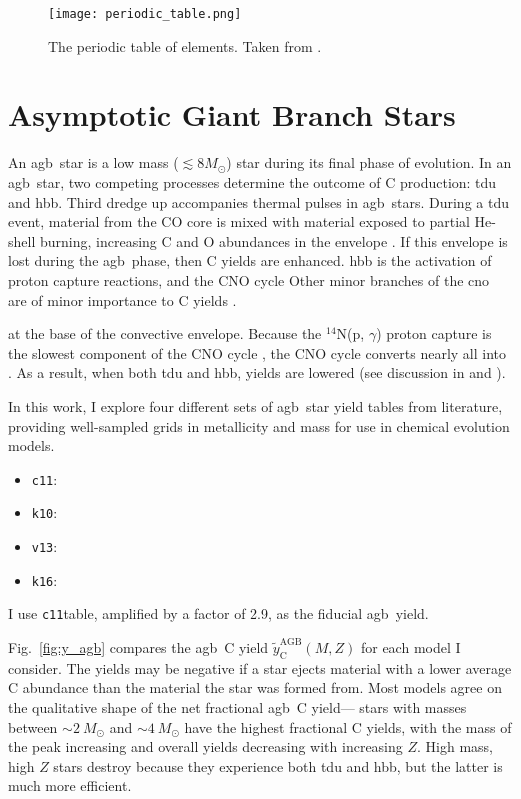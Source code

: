 \documentclass[12pt,oneside,letterpaper]{report}
\newcommand{\agb}{\gls{agb}}
\newcommand{\cxi}{\texttt{\gls{c11}}}
\newcommand{\kx}{\texttt{\gls{k10}}}
\newcommand{\kxvi}{\texttt{\gls{k16}}}
\newcommand{\vxiii}{\texttt{\gls{v13}}}
\newcommand{\sun}{\odot}
\newcommand{\about}[1]{${\sim} #1$}
\begin{document}
\begin{figure}[htp]
    \texttt{[image: periodic\_table.png]}
    \caption{The periodic table of elements. Taken from \cite{jennifer19}.}
\end{figure}

\section{Asymptotic Giant Branch Stars}\label{sec:agb}


An \agb\ star is a low mass ($\lesssim 8 M_{\sun}$) star during its final phase of evolution.  In an \agb\ star, two competing processes determine the outcome of C production: \gls{tdu} and \gls{hbb}.  Third dredge up accompanies thermal pulses in \agb\ stars. During a \gls{tdu} event, material from the CO core is mixed with material exposed to partial He-shell burning, increasing C and O abundances in the envelope \citep{KL14}. If this envelope is lost during the \agb\ phase, then C yields are enhanced.
\gls{hbb} is the activation of proton capture reactions, and the CNO cycle%
Other minor branches of the \gls{cno} are of minor importance to C yields
 \citep{solar-fusion}.

at the base of the convective envelope. Because the $^{14}$N(p, $\gamma$) proton capture is the slowest component of the CNO cycle \citep{solar-fusion}, the CNO cycle converts nearly all  into .
As a result, when both \gls{tdu} and \gls{hbb},  yields are lowered (see discussion in \citealt{james+23} and \citealt{ventura+13}).

    In this work, I explore four different sets of \agb\ star yield tables from literature, providing well-sampled grids in \gls{metallicity} and mass for use in chemical evolution models. 
\begin{itemize}
    \item \cxi: \citet{cristallo+11, cristallo+15}
    \item \kx: \citet{karakas10}
    \item \vxiii: \citet{ventura+13,ventura+14,ventura+18, ventura+20}
    \item \kxvi: \citet{KL16} \citet{karakas+18}
\end{itemize}
I use \cxi table, amplified by a factor of 2.9, as the fiducial \agb\ yield.

Fig.~\ref{fig:y_agb} compares the \agb\ C yield $\tilde{y}_\text{C}^\text{AGB}(M, Z)$ for each model I consider. 
The yields may be negative if a star ejects material with a lower average C abundance than the material the star was formed from.
Most models agree on the qualitative shape of the net fractional \agb\ C yield---%
stars with masses between \about{2~M_\odot} and \about{4~M_\odot} have the highest fractional C yields, with the mass of the peak increasing and overall yields decreasing with increasing $Z$.  High mass, high $Z$ stars destroy  because they experience both \gls{tdu} and \gls{hbb}, but the latter is much more efficient.
\end{document}
